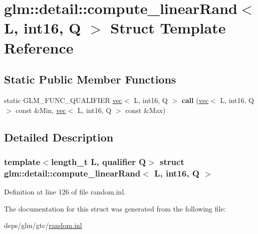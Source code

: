 \hypertarget{structglm_1_1detail_1_1compute__linearRand_3_01L_00_01int16_00_01Q_01_4}{}\section{glm\+:\+:detail\+:\+:compute\+\_\+linear\+Rand$<$ L, int16, Q $>$ Struct Template Reference}
\label{structglm_1_1detail_1_1compute__linearRand_3_01L_00_01int16_00_01Q_01_4}
\subsection*{Static Public Member Functions}
\begin{DoxyCompactItemize}
\item 
\mbox{\label{structglm_1_1detail_1_1compute__linearRand_3_01L_00_01int16_00_01Q_01_4_a9a3d3514acfa5f0895c900485d754a18}} 
static G\+L\+M\+\_\+\+F\+U\+N\+C\+\_\+\+Q\+U\+A\+L\+I\+F\+I\+ER \hyperlink{structglm_1_1vec}{vec}$<$ L, int16, Q $>$ {\bfseries call} (\hyperlink{structglm_1_1vec}{vec}$<$ L, int16, Q $>$ const \&Min, \hyperlink{structglm_1_1vec}{vec}$<$ L, int16, Q $>$ const \&Max)
\end{DoxyCompactItemize}


\subsection{Detailed Description}
\subsubsection*{template$<$length\+\_\+t L, qualifier Q$>$\newline
struct glm\+::detail\+::compute\+\_\+linear\+Rand$<$ L, int16, Q $>$}



Definition at line 126 of file random.\+inl.



The documentation for this struct was generated from the following file\+:\begin{DoxyCompactItemize}
\item 
deps/glm/gtc/\hyperlink{random_8inl}{random.\+inl}\end{DoxyCompactItemize}
